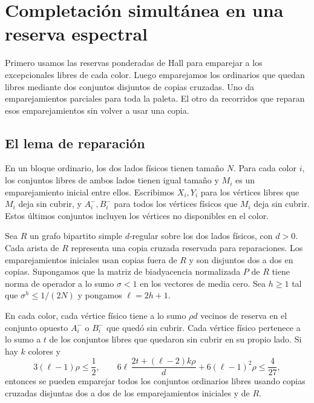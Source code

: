 \section{Completación simultánea en una reserva espectral}\label{sec:spectral-reserve}

Primero usamos las reservas ponderadas de Hall para emparejar a los excepcionales libres de cada color. Luego emparejamos los ordinarios que quedan libres mediante dos conjuntos disjuntos de copias cruzadas. Uno da emparejamientos parciales para toda la paleta. El otro da recorridos que reparan esos emparejamientos sin volver a usar una copia.

\subsection{El lema de reparación}

En un bloque ordinario, los dos lados físicos tienen tamaño \(N\). Para cada color \(i\), los conjuntos libres de ambos lados tienen igual tamaño y \(M_i\) es un emparejamiento inicial entre ellos. Escribimos \(X_i,Y_i\) para los vértices libres que \(M_i\) deja sin cubrir, y \(A_i^-,B_i^-\) para todos los vértices físicos que \(M_i\) deja sin cubrir. Estos últimos conjuntos incluyen los vértices no disponibles en el color.

\begin{lemma}\label{lem:spectral-repair}
Sea \(R\) un grafo bipartito simple \(d\)-regular sobre los dos lados físicos, con \(d>0\). Cada arista de \(R\) representa una copia cruzada reservada para reparaciones. Los emparejamientos iniciales usan copias fuera de \(R\) y son disjuntos dos a dos en copias. Supongamos que la matriz de biadyacencia normalizada \(P\) de \(R\) tiene norma de operador a lo sumo \(\sigma<1\) en los vectores de media cero. Sea \(h\ge1\) tal que \(\sigma^h\le1/(2N)\) y pongamos \(\ell=2h+1\).

En cada color, cada vértice físico tiene a lo sumo \(\rho d\) vecinos de reserva en el conjunto opuesto \(A_i^-\) o \(B_i^-\) que quedó sin cubrir. Cada vértice físico pertenece a lo sumo a \(t\) de los conjuntos libres que quedaron sin cubrir en su propio lado. Si hay \(k\) colores y
\[
 3(\ell-1)\rho\le\frac12,\qquad
 6\ell\,\frac{2t+(\ell-2)k\rho}{d}+6(\ell-1)^2\rho\le\frac{4}{27},
 \tag{P}\label{eq:spectral-repair}
\]
entonces se pueden emparejar todos los conjuntos ordinarios libres usando copias cruzadas disjuntas dos a dos de los emparejamientos iniciales y de \(R\).
\end{lemma}

